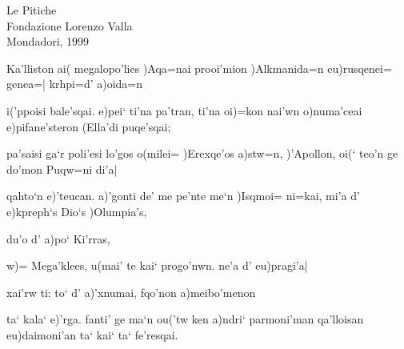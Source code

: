 \documentclass[11pt]{book}
\begin{document}
                 {Le Pitiche \\[.5ex] Fondazione Lorenzo Valla\\
                 Mondadori, 1999}

\begin{versus}      

\spatium {5ex}

   

      Ka'lliston ai( megalopo'lies )Aqa=nai  
      prooi'mion )Alkmanida=n eu)rusqenei= genea=|
      krhpi=d' a)oida=n

 

      i('ppoisi bale'sqai. e)pei` ti'na pa'tran, ti'na oi)=kon
      nai'wn o)numa'ceai
      e)pifane'steron
      (Ella'di puqe'sqai; 

     

      pa'saisi ga`r poli'esi lo'gos o(milei=
      )Erexqe'os a)stw=n, )'Apollon, oi(` teo'n ge do'mon
      Puqw=ni di'a|


      qahto`n e)'teucan. a)'gonti de' me pe'nte me`n )Isqmoi=
      ni=kai, mi'a d' e)kpreph`s
      Dio`s )Olumpia's,


      du'o d' a)po` Ki'rras,

 

      w)= Mega'klees, u(mai' te kai` progo'nwn.
      ne'a d' eu)pragi'a|


      xai'rw ti: to` d' a)'xnumai,
      fqo'non a)meibo'menon

  

      ta` kala` e)'rga. fanti' ge ma`n
      ou('tw ken a)ndri` parmoni'man
      qa'lloisan eu)daimoni'an
      ta` kai` ta` fe'resqai.

\end{versus}      
\end{document}
